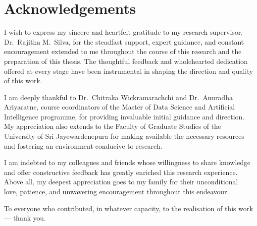 \chapter*{Acknowledgements}

\setlength{\parindent}{0pt}
I wish to express my sincere and heartfelt gratitude to my research supervisor, Dr.~Rajitha M.~Silva, for the steadfast support, expert guidance, and constant encouragement extended to me throughout the course of this research and the preparation of this thesis. The thoughtful feedback and wholehearted dedication offered at every stage have been instrumental in shaping the direction and quality of this work.

I am deeply thankful to Dr.~Chitraka Wickramarachchi and Dr.~Anuradha Ariyaratne, course coordinators of the Master of Data Science and Artificial Intelligence programme, for providing invaluable initial guidance and direction. My appreciation also extends to the Faculty of Graduate Studies of the University of Sri Jayewardenepura for making available the necessary resources and fostering an environment conducive to research.

I am indebted to my colleagues and friends whose willingness to share knowledge and offer constructive feedback has greatly enriched this research experience. Above all, my deepest appreciation goes to my family for their unconditional love, patience, and unwavering encouragement throughout this endeavour.

To everyone who contributed, in whatever capacity, to the realisation of this work — thank you.

